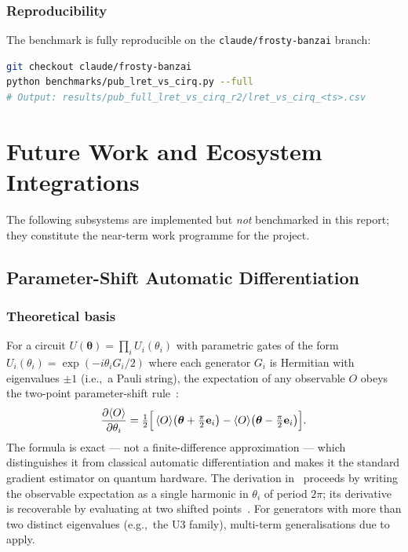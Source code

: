 \documentclass[11pt,a4paper]{article}
\begin{document}
\subsubsection*{Reproducibility}

The benchmark is fully reproducible on the \texttt{claude/frosty-banzai} branch:
\begin{lstlisting}[language=bash, caption={Reproducing the benchmark}]
git checkout claude/frosty-banzai
python benchmarks/pub_lret_vs_cirq.py --full
# Output: results/pub_full_lret_vs_cirq_r2/lret_vs_cirq_<ts>.csv
\end{lstlisting}

\section{Future Work and Ecosystem Integrations}
\label{sec:future}

The following subsystems are implemented but \emph{not} benchmarked in this report;
they constitute the near-term work programme for the project.

\subsection{Parameter-Shift Automatic Differentiation}
\label{sec:future-autodiff}

\subsubsection*{Theoretical basis}
For a circuit $U(\boldsymbol{\theta}) = \prod_i U_i(\theta_i)$ with parametric gates
of the form $U_i(\theta_i) = \exp(-i\theta_i G_i/2)$ where each generator $G_i$ is
Hermitian with eigenvalues $\pm 1$ (i.e.,\ a Pauli string), the expectation of any
observable $O$ obeys the two-point parameter-shift
rule~\cite{mitarai2018,schuld2019}:
\begin{equation}
  \frac{\partial \langle O \rangle}{\partial \theta_i}
  = \tfrac{1}{2}\Bigl[\,
      \langle O \rangle\bigl(\boldsymbol{\theta} + \tfrac{\pi}{2}\mathbf{e}_i\bigr)
    - \langle O \rangle\bigl(\boldsymbol{\theta} - \tfrac{\pi}{2}\mathbf{e}_i\bigr)
    \Bigr].
\end{equation}
The formula is exact --- not a finite-difference approximation --- which
distinguishes it from classical automatic differentiation and makes it the standard
gradient estimator on quantum hardware. The derivation in~\cite{schuld2019} proceeds
by writing the observable expectation as a single harmonic in $\theta_i$ of period
$2\pi$; its derivative is recoverable by evaluating at two shifted
points~\cite{schuld2019}. For generators with more than two distinct
eigenvalues (e.g.,\ the $\text{U}3$ family), multi-term generalisations
due to~\cite{banchi2021} apply.
\end{document}
